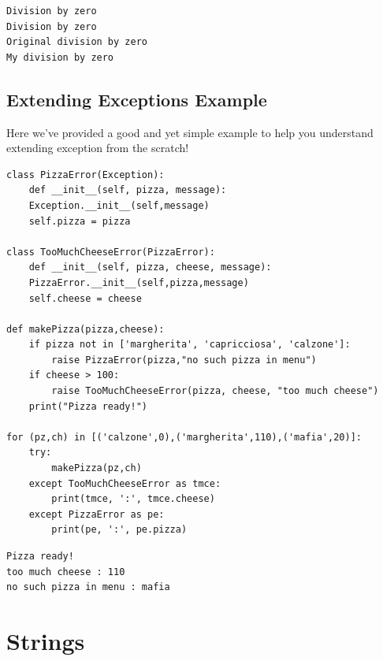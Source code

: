 \documentclass[11pt]{article}
\begin{document}
\begin{verbatim}
Division by zero
Division by zero
Original division by zero
My division by zero
\end{verbatim}

\newpage
\subsection{Extending Exceptions Example}
\label{sec:org96b97f6}
Here we've provided a good and yet simple example to help you
understand extending exception from the scratch!

\begin{verbatim}
class PizzaError(Exception):
    def __init__(self, pizza, message):
	Exception.__init__(self,message)
	self.pizza = pizza

class TooMuchCheeseError(PizzaError):
    def __init__(self, pizza, cheese, message):
	PizzaError.__init__(self,pizza,message)
	self.cheese = cheese

def makePizza(pizza,cheese):
	if pizza not in ['margherita', 'capricciosa', 'calzone']:
		raise PizzaError(pizza,"no such pizza in menu")
	if cheese > 100:
		raise TooMuchCheeseError(pizza, cheese, "too much cheese")
	print("Pizza ready!")

for (pz,ch) in [('calzone',0),('margherita',110),('mafia',20)]:
	try:
		makePizza(pz,ch)
	except TooMuchCheeseError as tmce:
		print(tmce, ':', tmce.cheese)
	except PizzaError as pe:
		print(pe, ':', pe.pizza)
\end{verbatim}

\begin{verbatim}
Pizza ready!
too much cheese : 110
no such pizza in menu : mafia
\end{verbatim}

\newpage

\section{Strings}
\label{sec:org2bc212c}
\end{document}
